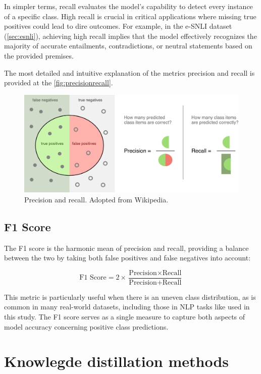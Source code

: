 In simpler terms, recall evaluates the model's capability to detect every instance of a specific class. High recall is crucial in critical applications where missing true positives could lead to dire outcomes. For example, in the e-SNLI dataset (\autoref{sec:esnli}), achieving high recall implies that the model effectively recognizes the majority of accurate entailments, contradictions, or neutral statements based on the provided premises.

The most detailed and intuitive explanation of the metrics precision and recall is provided at the \autoref{fig:precisionrecall}.

\begin{figure}[h!]
    \centering
    \includegraphics[width=0.9\linewidth]{figs/precisionrecall.jpg}
    \caption[Precision and recall]{Precision and recall. Adopted from Wikipedia\protect\footnotemark.}
    \label{fig:precisionrecall}
\end{figure}


\subsection{F1 Score}
The F1 score is the harmonic mean of precision and recall, providing a balance between the two by taking both false positives and false negatives into account:

$$
    \text{F1 Score} = 2 \times \frac{\text{Precision} \times \text{Recall}}{\text{Precision} + \text{Recall}}
$$

This metric is particularly useful when there is an uneven class distribution, as is common in many real-world datasets, including those in NLP tasks like used in this study. The F1 score serves as a single measure to capture both aspects of model accuracy concerning positive class predictions.


\section{Knowlegde distillation methods}


